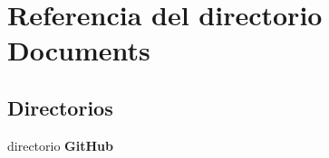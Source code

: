 \section{Referencia del directorio Documents}
\label{dir_f396504afdc959660871b003fa10164d}
\subsection*{Directorios}
\begin{DoxyCompactItemize}
\item 
directorio {\bf Git\-Hub}
\end{DoxyCompactItemize}
